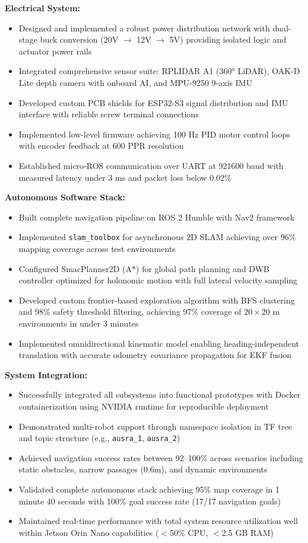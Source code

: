\textbf{Electrical System:}
\begin{itemize}
    \item Designed and implemented a robust power distribution network with dual-stage buck conversion (20V $\rightarrow$ 12V $\rightarrow$ 5V) providing isolated logic and actuator power rails
    \item Integrated comprehensive sensor suite: RPLIDAR A1 (360° LiDAR), OAK-D Lite depth camera with onboard AI, and MPU-9250 9-axis IMU
    \item Developed custom PCB shields for ESP32-S3 signal distribution and IMU interface with reliable screw terminal connections
    \item Implemented low-level firmware achieving 100 Hz PID motor control loops with encoder feedback at 600 PPR resolution
    \item Established micro-ROS communication over UART at 921600 baud with measured latency under 3 ms and packet loss below 0.02\%
\end{itemize}

\textbf{Autonomous Software Stack:}
\begin{itemize}
    \item Built complete navigation pipeline on ROS 2 Humble with Nav2 framework
    \item Implemented \texttt{slam\_toolbox} for asynchronous 2D SLAM achieving over 96\% mapping coverage across test environments
    \item Configured SmacPlanner2D (A*) for global path planning and DWB controller optimized for holonomic motion with full lateral velocity sampling
    \item Developed custom frontier-based exploration algorithm with BFS clustering and 98\% safety threshold filtering, achieving 97\% coverage of $20 \times 20$ m environments in under 3 minutes
    \item Implemented omnidirectional kinematic model enabling heading-independent translation with accurate odometry covariance propagation for EKF fusion
\end{itemize}

\textbf{System Integration:}
\begin{itemize}
    \item Successfully integrated all subsystems into functional prototypes with Docker containerization using NVIDIA runtime for reproducible deployment
    \item Demonstrated multi-robot support through namespace isolation in TF tree and topic structure (e.g., \texttt{ausra\_1}, \texttt{ausra\_2})
    \item Achieved navigation success rates between 92--100\% across scenarios including static obstacles, narrow passages (0.6m), and dynamic environments
    \item Validated complete autonomous stack achieving 95\% map coverage in 1 minute 40 seconds with 100\% goal success rate (17/17 navigation goals)
    \item Maintained real-time performance with total system resource utilization well within Jetson Orin Nano capabilities ($<$50\% CPU, $<$2.5 GB RAM)
\end{itemize}

